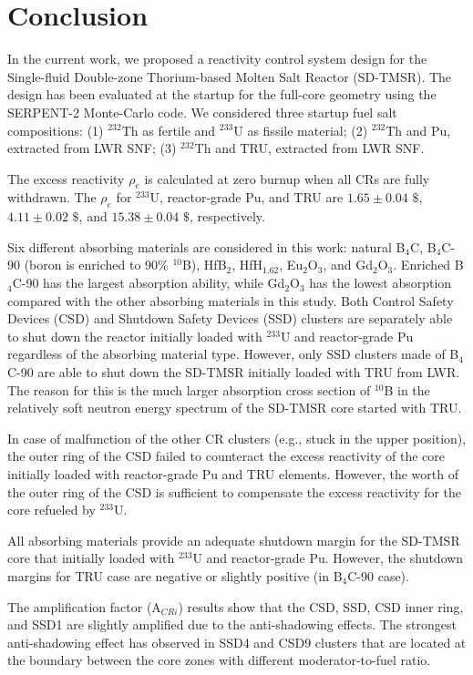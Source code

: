 \section{Conclusion} \label{Conclusion}
In the current work, we proposed a reactivity control system design for the 
Single-fluid Double-zone Thorium-based Molten Salt Reactor (SD-TMSR). The 
design has been evaluated at the startup for the full-core geometry using the
SERPENT-2 Monte-Carlo code. We considered three startup fuel salt compositions:
(1) $^{232}$Th as fertile and $^{233}$U as fissile material; 
(2) $^{232}$Th and Pu, extracted from \gls{LWR} \gls{SNF}; (3) 
$^{232}$Th and TRU, extracted from \gls{LWR} \gls{SNF}.

The excess reactivity $\rho_e$ is calculated at zero burnup when all CRs are 
fully withdrawn. The $\rho_e$ for $^{233}$U, reactor-grade Pu, and 
TRU are $1.65\pm0.04$ $\$$, $4.11\pm0.02$ $\$$, and $15.38\pm0.04$ $\$$, 
respectively.

Six different absorbing materials are considered in this work:
natural B$_4$C, B$_4$C-90 (boron is enriched to 90\% $^{10}$B), HfB$_2$, 
HfH$_{1.62}$, Eu$_2$O$_3$, and Gd$_2$O$_3$. Enriched B$_4$C-90 has the largest 
absorption ability, while Gd$_2$O$_3$ has the lowest absorption compared with 
the other absorbing materials in this study. Both Control Safety Devices (CSD)
and Shutdown Safety Devices (SSD) clusters are 
separately able to shut down the reactor initially loaded with $^{233}$U and 
reactor-grade Pu regardless of the absorbing material type. However, only SSD 
clusters made of B$_4$C-90 are able to shut down the SD-TMSR initially loaded 
with TRU from \gls{LWR}. The reason for this is the much larger 
absorption cross section of $^{10}$B in the relatively soft neutron energy 
spectrum of the SD-TMSR core started with TRU.

In case of malfunction of the other CR clusters (e.g., stuck in the upper 
position), the outer ring of the CSD failed to counteract the excess 
reactivity of the core initially loaded with reactor-grade Pu and TRU elements.
However, the worth of the outer ring of the CSD is sufficient 
to compensate the excess reactivity for the core refueled by $^{233}$U.

All absorbing materials provide an adequate shutdown margin for the SD-TMSR 
core that initially loaded with $^{233}$U and reactor-grade Pu. However, the 
shutdown margins for TRU case are negative or slightly positive (in B$_4$C-90 
case).

The amplification factor (A$_{CRi}$) results show that the CSD, SSD, CSD inner ring, and SSD1 are slightly amplified due to the anti-shadowing effects. The strongest anti-shadowing effect has observed in SSD4 and CSD9 clusters that are located at the boundary between the core zones with different moderator-to-fuel ratio.

